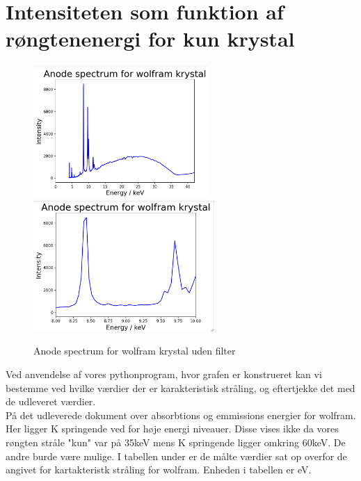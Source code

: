 \documentclass[a4paper,twoside]{article}
\begin{document}
\section{Intensiteten som funktion af røngtenenergi for kun krystal}

\begin{figure}[H]
\begin{centering}
\includegraphics[height=5cm]{Wolfram krystal.png}
\includegraphics[height=5cm]{zoomed in.png}
\hspace{1cm}
\par\end{centering}
\caption{\label{cap:2ien} Anode spectrum for wolfram krystal uden filter }
\end{figure}
Ved anvendelse af vores pythonprogram, hvor grafen er konstrueret kan vi bestemme ved hvilke værdier der er karakteristisk stråling, og eftertjekke det med de udleveret værdier. 
\\ På det udleverede dokument over absorbtions og emmissions energier for wolfram. Her ligger K springende ved for høje energi niveauer. Disse vises ikke da vores røngten stråle "kun" var på 35keV mens K springende ligger omkring 60keV. De andre burde være mulige. I tabellen under er de målte værdier sat op overfor de angivet for kartakteristk stråling for wolfram. Enheden i tabellen er eV. 
\end{document}
